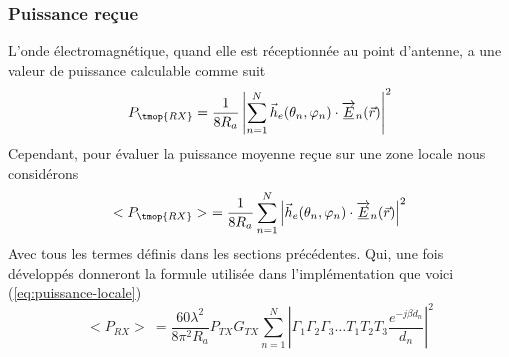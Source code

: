 \subsubsection*{Puissance reçue}
L'onde {\'e}lectromagn{\'e}tique, quand elle est r{\'e}ceptionn{\'e}e au point
d'antenne, a une valeur de puissance calculable
comme suit
\[ P_{\tmop{RX}} = \frac{1}{8 R_a} \left| \sum_{n = 1}^N \vec{h}_e (\theta_n,
   \varphi_n) \cdot \overrightarrow{\underline{E}}_n (\vec{r}) \right|^2 \]
Cependant, pour {\'e}valuer la puissance moyenne re{\c c}ue sur une zone locale nous considérons 
\[ < P_{\tmop{RX}} >\ = \frac{1}{8 R_a} \sum_{n = 1}^N \left| \vec{h}_e (\theta_n,
   \varphi_n) \cdot \overrightarrow{\underline{E}}_n (\vec{r}) \right|^2 \]
Avec tous les termes d{\'e}finis dans les sections pr{\'e}c{\'e}dentes. Qui, une fois développés donneront la formule utilisée dans l'implémentation que voici
(\ref{eq:puissance-locale})
\begin{equation}
\label{eq:puissance-locale}
    <P_{RX}>\ = \frac{60 \lambda^2}{8 \pi^2 R_a}P_{TX}G_{TX}\sum_{n=1}^N \left| \Gamma_1 \Gamma_2 \Gamma_3 \dotsc T_1 T_2 T_3 \frac{e^{-j \beta d_n}}{d_n} \right|^2
\end{equation}

\ 